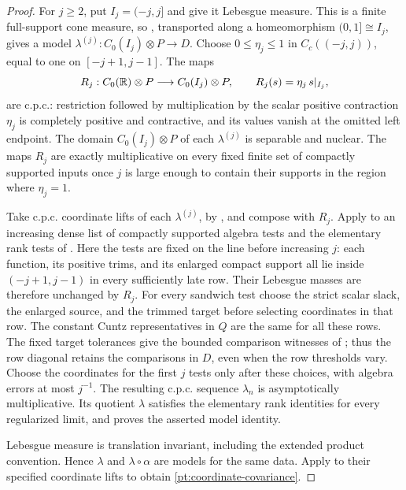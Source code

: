 \begin{proof}
For \(j\geq2\), put \(I_j=(-j,j]\) and give it Lebesgue
measure.  This is a finite full-support cone measure, so
, transported along a homeomorphism
\((0,1]\cong I_j\), gives a model
\(\lambda^{(j)}:C_0(I_j)\otimes P\to D\).
Choose \(0\leq\eta_j\leq1\) in \(C_c((-j,j))\), equal
to one on \([-j+1,j-1]\).  The maps
\[
 R_j:C_0(\mathbb R)\otimes P\longrightarrow C_0(I_j)\otimes P,
 \qquad R_j(s)=\eta_j\,s|_{I_j},
\]
are c.p.c.: restriction followed by multiplication by the scalar
positive contraction $\eta_j$ is completely positive and contractive,
and its values vanish at the omitted left endpoint. The domain
$C_0(I_j)\otimes P$ of each $\lambda^{(j)}$ is separable and nuclear.
The maps $R_j$ are exactly multiplicative on every
fixed finite set of compactly supported inputs once \(j\)
is large enough to contain their supports in the region
where \(\eta_j=1\).

Take c.p.c. coordinate lifts of each \(\lambda^{(j)}\),
by \cite[Theorem~3.10]{ChoiEffrosLifting}, and compose with \(R_j\).
Apply  to an increasing dense list of
compactly supported algebra tests and the elementary rank
tests of .
Here the tests are fixed on the line before increasing
\(j\): each function, its positive trims, and its enlarged
compact support all lie inside \((-j+1,j-1)\) in every
sufficiently late row.  Their Lebesgue masses are therefore
unchanged by \(R_j\).
For every sandwich test choose the strict scalar slack,
the enlarged source, and the trimmed target before selecting
coordinates in that row.  The constant Cuntz representatives
in \(Q\) are the same for all these rows.
The fixed target tolerances give the bounded comparison
witnesses of ; thus the row
diagonal retains the comparisons in \(D\), even when the
row thresholds vary.
Choose the coordinates for the first \(j\) tests only
after these choices, with algebra errors at most \(j^{-1}\).
The resulting c.p.c. sequence \(\lambda_n\) is
asymptotically multiplicative.  Its quotient
\(\lambda\) satisfies the elementary rank identities for
every regularized limit, and
 proves the asserted model
identity.

Lebesgue measure is translation invariant, including the
extended product convention.  Hence \(\lambda\) and
\(\lambda\circ\alpha\) are models for the same data.
Apply  to their specified coordinate
lifts to obtain \eqref{pt:coordinate-covariance}.
\end{proof}

